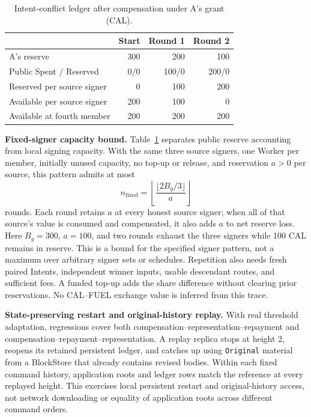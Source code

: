 \begin{table}[!t]
\caption{Intent-conflict ledger after compensation under A's grant (CAL).}
\label{tab:s3-ledger}
\centering\small
\begin{tabular}{@{}lrrr@{}}
\toprule
 & Start & Round 1 & Round 2 \\
\midrule
A's reserve & 300 & 200 & 100 \\
Public Spent / Reserved & 0/0 & 100/0 & 200/0 \\
Reserved per source signer & 0 & 100 & 200 \\
Available per source signer & 200 & 100 & 0 \\
Available at fourth member & 200 & 200 & 200 \\
\bottomrule
\end{tabular}
\end{table}

\noindent\textbf{Fixed-signer capacity bound.}
Table~\ref{tab:s3-ledger} separates public reserve accounting from
local signing capacity. With the same three source signers, one Worker
per member, initially unused capacity, no top-up or release, and
reservation $a>0$ per source, this pattern admits at most
\[
  n_{\mathrm{fixed}}=\left\lfloor
       \frac{\lfloor2B_g/3\rfloor}{a}\right\rfloor
\]
rounds. Each round retains $a$ at every honest source signer; when all
of that source's value is consumed and compensated, it also adds $a$
to net reserve loss. Here $B_g=300$, $a=100$, and two rounds exhaust
the three signers while 100 CAL remains in reserve. This is a bound
for the specified signer pattern, not a maximum over arbitrary
signer sets or schedules. Repetition also needs fresh paired Intents,
independent winner inputs, usable descendant routes, and sufficient
fees. A funded top-up adds the share difference without clearing prior
reservations. No CAL--FUEL exchange value is inferred from this trace.

\noindent\textbf{State-preserving restart and original-history replay.}
With real threshold adaptation, regressions cover both
compensation--representation--repayment and
compensation--repayment--representation. A replay replica stops at
height 2, reopens its retained persistent ledger, and catches up using
\texttt{Original} material from a BlockStore that already contains
revised bodies. Within each fixed command history, application roots
and ledger rows match the reference at every replayed height.
This exercises local persistent restart and original-history access,
not network downloading or equality of application roots across
different command orders.

